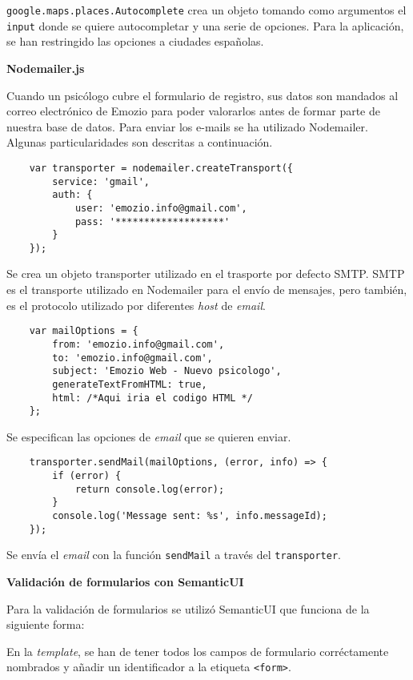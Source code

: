 \texttt{google.maps.places.Autocomplete} crea un objeto tomando como argumentos el \texttt{input} donde se quiere autocompletar y una serie de opciones. Para la aplicación, se han restringido las opciones a ciudades españolas.\newline


\textbf{Nodemailer.js}


Cuando un psicólogo cubre el formulario de registro, sus datos son mandados al correo electrónico de Emozio para poder valorarlos antes de formar parte de nuestra base de datos. Para enviar los e-mails se ha utilizado Nodemailer. Algunas particularidades son descritas a continuación.


\medskip
\begin{lstlisting}
	var transporter = nodemailer.createTransport({ 
		service: 'gmail', 
		auth: { 
			user: 'emozio.info@gmail.com', 
			pass: '*******************' 
		} 
	});
\end{lstlisting}


Se crea un objeto transporter utilizado en el trasporte por defecto SMTP. SMTP es el transporte utilizado en Nodemailer para el envío de mensajes, pero también, es el protocolo utilizado por diferentes \textit{host} de \textit{email}.


\medskip
\begin{lstlisting}
	var mailOptions = { 
		from: 'emozio.info@gmail.com', 
		to: 'emozio.info@gmail.com', 
		subject: 'Emozio Web - Nuevo psicologo', 
		generateTextFromHTML: true,
		html: /*Aqui iria el codigo HTML */
	};
\end{lstlisting}


Se especifican las opciones de \textit{email} que se quieren enviar.


\medskip
\begin{lstlisting}
	transporter.sendMail(mailOptions, (error, info) => { 
		if (error) { 
			return console.log(error); 
		} 
		console.log('Message sent: %s', info.messageId); 
	});
\end{lstlisting}


Se envía el \textit{email} con la función \texttt{sendMail} a través del \texttt{transporter}. \newline


\textbf{Validación de formularios con SemanticUI}


Para la validación de formularios se utilizó SemanticUI que funciona de la siguiente forma:


En la \textit{template}, se han de tener todos los campos de formulario corréctamente nombrados y añadir un identificador a la etiqueta \texttt{<form>}.


